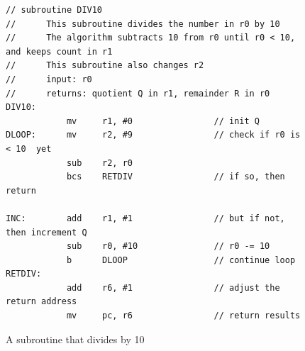 \documentclass[epsfig,10pt,fullpage]{article} \addtolength{\textwidth}{1.5in}
\begin{document}
\lstset{language=ASM,numbers=none,escapechar=|}
\begin{figure}[H]
\begin{center}
\begin{minipage}[h]{15 cm}
\begin{lstlisting}[name=proc]
// subroutine DIV10
//      This subroutine divides the number in r0 by 10
//      The algorithm subtracts 10 from r0 until r0 < 10, and keeps count in r1
//      This subroutine also changes r2
//      input: r0
//      returns: quotient Q in r1, remainder R in r0
DIV10:
            mv     r1, #0                // init Q
DLOOP:      mv     r2, #9                // check if r0 is < 10  yet
            sub    r2, r0
            bcs    RETDIV                // if so, then return

INC:        add    r1, #1                // but if not, then increment Q
            sub    r0, #10               // r0 -= 10
            b      DLOOP                 // continue loop
RETDIV:
            add    r6, #1                // adjust the return address
            mv     pc, r6                // return results
\end{lstlisting}
\end{minipage}
\caption{A subroutine that divides by 10}
\label{fig:div10}
\end{center}
\end{figure}
\end{document}
